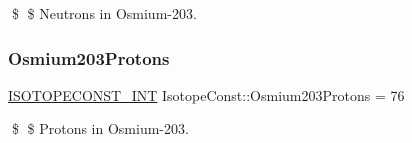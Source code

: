 \$ \$ Neutrons in Osmium-\/203. \mbox{\label{group___isotope_const-_osmium-_os203_gadec91ff7ba09c145a14780531ffbe921}} 
\subsubsection{\texorpdfstring{Osmium203\+Protons}{Osmium203Protons}}
{\footnotesize\ttfamily \mbox{\hyperlink{group___isotope_const-_macros_ga5f18360b3e99483a35c32d789e62621c}{I\+S\+O\+T\+O\+P\+E\+C\+O\+N\+S\+T\+\_\+\+I\+NT}} Isotope\+Const\+::\+Osmium203\+Protons = 76}

\$ \$ Protons in Osmium-\/203. 